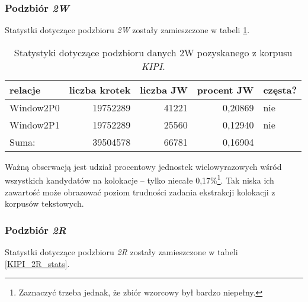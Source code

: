 \subsubsection{Podzbiór \protect\textit{2W}}
Statystki dotyczące podzbioru \emph{2W} zostały zamieszczone w tabeli \ref{KIPI_2W_stats}.

\begin{table}[h!]
\centering
\begin{tabular}{ l | r | r | r | l }
	\toprule
	\textbf{relacje} 	& \textbf{liczba krotek} & \textbf{liczba JW} & \textbf{procent JW} & \textbf{częsta?} 	\\
	\midrule
	Window2P0	&	19752289	&	41221	&	0,20869	&	nie	\\
	Window2P1	&	19752289	&	25560	&	0,12940	&	nie	\\
	\midrule									
	Suma:	&	39504578	&	66781	&	0,16904	&		\\
	\bottomrule
\end{tabular}
\caption[Statystyki podzbioru danych \emph{KIPI} 2W]{Statystyki dotyczące podzbioru danych 2W pozyskanego z korpusu \emph{KIPI}.}
\label{KIPI_2W_stats}
\end{table}

Ważną obserwacją jest udział procentowy jednostek wielowyrazowych wśród wszystkich kandydatów na kolokacje -- tylko niecałe 0,17\%\footnote{Zaznaczyć trzeba jednak, że zbiór wzorcowy był bardzo niepełny.}.
Tak niska ich zawartość może obrazować poziom trudności zadania ekstrakcji kolokacji z korpusów tekstowych.


\subsubsection{Podzbiór \protect\textit{2R}}
Statystki dotyczące podzbioru \emph{2R} zostały zamieszczone w tabeli \ref{KIPI_2R_stats}.

